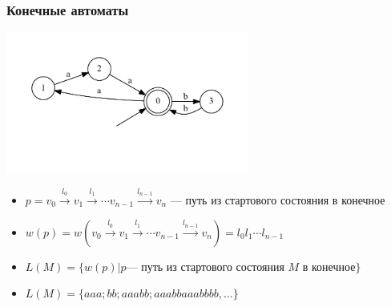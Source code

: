 \documentclass[xcolor=table]{beamer}
\begin{document}
\begin{frame}[fragile]
  \transwipe[direction=90]
  \frametitle{Конечные автоматы}
\begin{center}
        \includegraphics[width=0.6\textwidth]{pictures/atm.pdf} 
\end{center}
  \begin{itemize}
  \item $p = v_0 \xrightarrow{l_0} v_1 \xrightarrow{l_1} \cdots v_{n-1}\xrightarrow{l_{n-1}}v_n$ --- путь из стартового состояния в конечное
  \item $w(p) = w(v_0 \xrightarrow{l_0} v_1 \xrightarrow{l_1} \cdots v_{n-1}\xrightarrow{l_{n-1}}v_n) = l_0 l_1 \cdots l_{n-1}$
  \item $L(M) = \{w(p) | p  \text{--- путь из стартового состояния $M$ в конечное}\}$
  \item $L(M) = \{aaa; bb; aaabb; aaabbaaabbbb, \dots\}$
  \end{itemize}

\end{frame}
\end{document}
